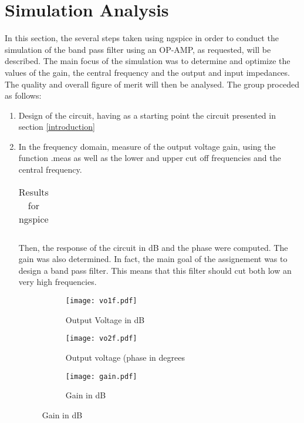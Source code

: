 \section{Simulation Analysis}
\label{section:sim}
 
In this section, the several steps taken using ngspice in order to conduct the simulation of the band pass filter using an OP-AMP, as requested, will be described. The main focus of the simulation was to determine and optimize the values of the gain, the central frequency and the output and input impedances. The quality and overall figure of merit will then be analysed.
The group proceded as follows:

\begin{enumerate}
\item Design of the circuit, having as a starting point the circuit presented in section \ref{introduction}

  
\item  In the frequency domain, measure of the output voltage gain, using the function .meas as well as the lower and upper cut off frequencies and the central frequency.


\begin{table}[ht]
  \centering
  \begin{tabular}{|l|r|}
    \hline    
   
    \end{tabular}
  \caption{Results for ngspice}
    \label{tab:results}
\end{table}


Then, the response of the circuit in dB and the phase were computed. The gain was also determined. In fact, the main goal of the assignement was to design a band pass filter. This means that this filter should cut both low an very high frequencies. 




\begin{figure}[ht]
\centering
\begin{subfigure}{.5\textwidth}
  \centering
  \texttt{[image: vo1f.pdf]}
  \caption{Output Voltage in dB}
  \label{fig:sim5}
\end{subfigure}%
\begin{subfigure}{.5\textwidth}
  \centering
  \texttt{[image: vo2f.pdf]}
  \caption{Output voltage (phase in degrees}
  \label{fig:sim6}
  \end{subfigure}
  \begin{subfigure}{.5\textwidth}
  \centering
  \texttt{[image: gain.pdf]}
  \caption{Gain in dB}
  \label{fig:sim6}


\end{subfigure}
\end{figure}
\end{enumerate}
